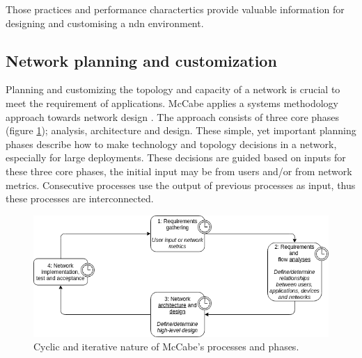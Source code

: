 \documentclass[conference]{IEEEtran}
\begin{document}

Those practices and performance charactertics provide valuable information for designing and customising a \gls{ndn} environment.  

\subsection{Network planning and customization}
Planning and customizing the topology and capacity of a network is crucial to meet the requirement of applications. McCabe applies a systems methodology approach towards network design \cite{mccabe2010network}. The approach consists of three core phases (figure \ref{fig:mccabe-process}); analysis, architecture and design. These simple, yet important planning phases describe how to make technology and topology decisions in a network, especially for large deployments. These decisions are guided based on inputs for these three core phases, the initial input may be from users and/or from network metrics. Consecutive processes use the output of previous processes as input, thus these processes are interconnected.

\begin{figure}[H]
\centering
\includegraphics[width=\columnwidth]{images/mccabe-process.png}
\caption{Cyclic and iterative nature of McCabe's processes and phases.}
\label{fig:mccabe-process}
\end{figure}
\end{document}
